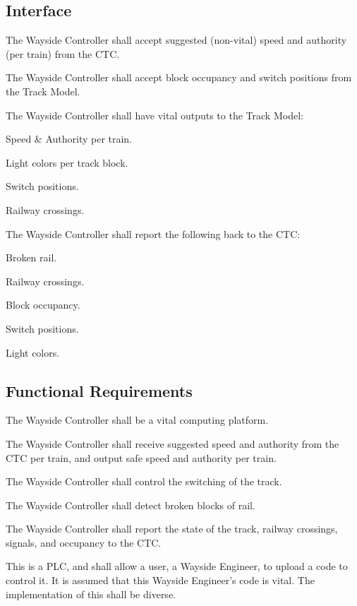 \documentclass{scrreprt}
\begin{document}
\subsection{Interface}
\begin{numonly}
    \item The Wayside Controller shall accept suggested (non-vital) speed and authority (per train) from the CTC.
    \item The Wayside Controller shall accept block occupancy and switch positions from the Track Model.
    \item The Wayside Controller shall have vital outputs to the Track Model:
    \begin{numonly}
        \item Speed \& Authority per train.
        \item Light colors per track block.
        \item Switch positions.
        \item Railway crossings.
    \end{numonly}
    \item The Wayside Controller shall report the following back to the CTC:
    \begin{numonly}
        \item Broken rail.
        \item Railway crossings.
        \item Block occupancy.
        \item Switch positions.
        \item Light colors.
    \end{numonly}
\end{numonly}

\subsection{Functional Requirements}
\begin{numonly}
    \item The Wayside Controller shall be a vital computing platform.
    \item The Wayside Controller shall receive suggested speed and authority from the CTC per train, and output safe speed and authority per train.
    \item The Wayside Controller shall control the switching of the track.
    \item The Wayside Controller shall detect broken blocks of rail.
    \item The Wayside Controller shall report the state of the track, railway crossings, signals, and occupancy to the CTC.
    \item This is a PLC, and shall allow a user, a Wayside Engineer, to upload a code to control it. It is assumed that this Wayside Engineer's code is vital. The implementation of this shall be diverse.
\end{numonly}
\end{document}
